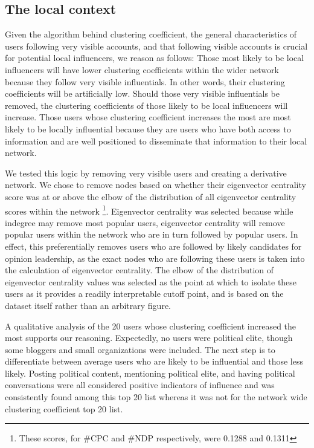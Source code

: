 \documentclass[a4paper,12pt]{article}
\begin{document}
\subsection{The local context}

Given the algorithm behind clustering coefficient, the general characteristics of users following very visible accounts, and that following visible accounts is crucial for potential local influencers, we reason as follows: Those most likely to be local influencers will have lower clustering coefficients within the wider network because they follow very visible influentials. In other words, their clustering coefficients will be artificially low. Should those very visible influentials be removed, the clustering coefficients of those likely to be local influencers will increase. Those users whose clustering coefficient increases the most are most likely to be locally influential because they are users who have both access to information and are well positioned to disseminate that information to their local network. 

We tested this logic by removing very visible users and creating a derivative network. We chose to remove nodes based on whether their eigenvector centrality score was at or above the elbow of the distribution of all eigenvector centrality scores within the network \footnote{These scores, for \#CPC and \#NDP respectively, were 0.1288 and 0.1311}. Eigenvector centrality was selected because while indegree may remove most popular users, eigenvector centrality will remove popular users within the network who are in turn followed by popular users. In effect, this preferentially removes users who are followed by likely candidates for opinion leadership, as the exact nodes who are following these users is taken into the calculation of eigenvector centrality. The elbow of the distribution of eigenvector centrality values was selected as the point at which to isolate these users as it provides a readily interpretable cutoff point, and is based on the dataset itself rather than an arbitrary figure.

A qualitative analysis of the 20 users whose clustering coefficient increased the most supports our reasoning. Expectedly, no users were political elite, though some bloggers and small organizations were included. The next step is to differentiate between average users who are likely to be influential and those less likely. Posting political content, mentioning political elite, and having political conversations were all considered positive indicators of influence and was consistently found among this top 20 list whereas it was not for the network wide clustering coefficient top 20 list.
\end{document}
